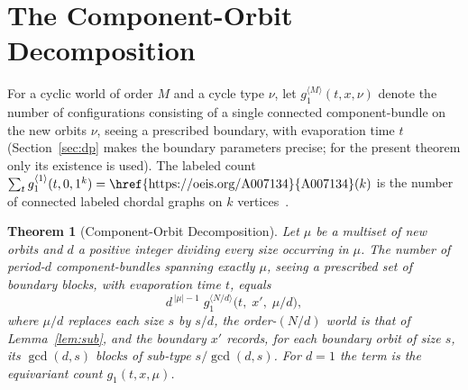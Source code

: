 \documentclass[11pt]{article}
\theoremstyle{plain}
\newtheorem{theorem}{Theorem}
\theoremstyle{definition}
\begin{document}
\section{The Component-Orbit Decomposition}\label{sec:cod}

For a cyclic world of order $M$ and a cycle type $\nu$, let $g_1^{\langle M\rangle}(t,x,\nu)$ denote
the number of configurations consisting of a single connected component-bundle on the new orbits
$\nu$, seeing a prescribed boundary, with evaporation time $t$ (Section~\ref{sec:dp} makes the
boundary parameters precise; for the present theorem only its existence is used). The labeled count
$\sum_t g_1^{\langle 1\rangle}(t,0,1^k)=\text{\href{https://oeis.org/A007134}{A007134}}(k)$ is the
number of connected labeled chordal graphs on $k$ vertices~\cite{HLV2023}.

\begin{theorem}[Component-Orbit Decomposition]\label{thm:cod}
Let $\mu$ be a multiset of new orbits and $d$ a positive integer dividing every size occurring in
$\mu$. The number of period-$d$ component-bundles spanning exactly $\mu$, seeing a prescribed set of
boundary blocks, with evaporation time $t$, equals
\[
d^{\,|\mu|-1}\; g_1^{\langle N/d\rangle}\!\big(t,\;x',\;\mu/d\big),
\]
where $\mu/d$ replaces each size $s$ by $s/d$, the order-$(N/d)$ world is that of
Lemma~\ref{lem:sub}, and the boundary $x'$ records, for each boundary orbit of size $s$, its
$\gcd(d,s)$ blocks of sub-type $s/\gcd(d,s)$. For $d=1$ the term is the equivariant count $g_1(t,x,\mu)$.
\end{theorem}
\end{document}
